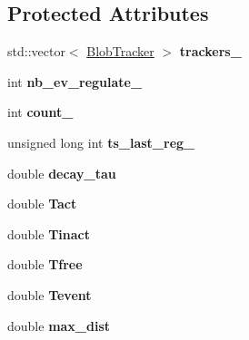 \subsection*{Protected Attributes}
\begin{DoxyCompactItemize}
\item 
\hypertarget{classTrackerPool_a8a8bdb245a4e706de8f9263cc31537cd}{std\-::vector$<$ \hyperlink{classBlobTracker}{Blob\-Tracker} $>$ {\bfseries trackers\-\_\-}}\label{classTrackerPool_a8a8bdb245a4e706de8f9263cc31537cd}

\item 
\hypertarget{classTrackerPool_af542ddb16630e451065d5e3258cd19de}{int {\bfseries nb\-\_\-ev\-\_\-regulate\-\_\-}}\label{classTrackerPool_af542ddb16630e451065d5e3258cd19de}

\item 
\hypertarget{classTrackerPool_a5aed0a9c9621c9fde35034a8b5f58085}{int {\bfseries count\-\_\-}}\label{classTrackerPool_a5aed0a9c9621c9fde35034a8b5f58085}

\item 
\hypertarget{classTrackerPool_ac8ecd306ab6f0562ca2d6231ff367093}{unsigned long int {\bfseries ts\-\_\-last\-\_\-reg\-\_\-}}\label{classTrackerPool_ac8ecd306ab6f0562ca2d6231ff367093}

\item 
\hypertarget{classTrackerPool_abe7439ab3a403e77b56def1ae14ef1c3}{double {\bfseries decay\-\_\-tau}}\label{classTrackerPool_abe7439ab3a403e77b56def1ae14ef1c3}

\item 
\hypertarget{classTrackerPool_aaf7de0a0903e66d7ae07cc11cb6ea072}{double {\bfseries Tact}}\label{classTrackerPool_aaf7de0a0903e66d7ae07cc11cb6ea072}

\item 
\hypertarget{classTrackerPool_a75d2a1d3867ac839d3c24aa26241950e}{double {\bfseries Tinact}}\label{classTrackerPool_a75d2a1d3867ac839d3c24aa26241950e}

\item 
\hypertarget{classTrackerPool_ac75f2360d9bb76e0a6c79b31129c58c5}{double {\bfseries Tfree}}\label{classTrackerPool_ac75f2360d9bb76e0a6c79b31129c58c5}

\item 
\hypertarget{classTrackerPool_a3798b118a9592e75d59ad0d0e5fe438b}{double {\bfseries Tevent}}\label{classTrackerPool_a3798b118a9592e75d59ad0d0e5fe438b}

\item 
\hypertarget{classTrackerPool_ad57d26c00d4329747f59df1b7b24ea3b}{double {\bfseries max\-\_\-dist}}\label{classTrackerPool_ad57d26c00d4329747f59df1b7b24ea3b}


\end{DoxyCompactItemize}
